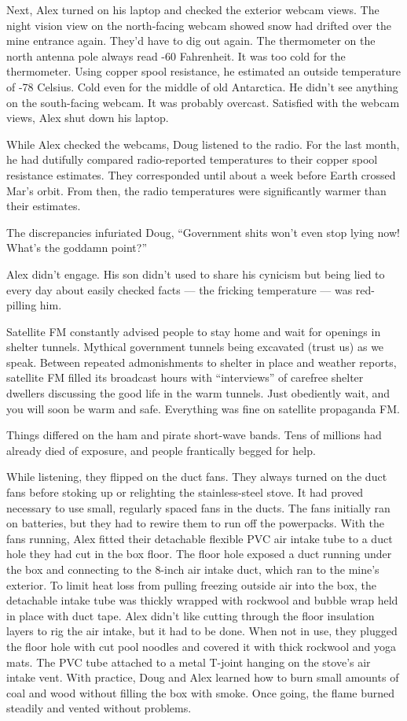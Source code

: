 Next, Alex turned on his laptop and checked the exterior webcam views.
The night vision view on the north-facing webcam showed snow had drifted
over the mine entrance again. They'd have to dig out again. The
thermometer on the north antenna pole always read -60 Fahrenheit. It was
too cold for the thermometer. Using copper spool resistance, he
estimated an outside temperature of -78 Celsius. Cold even for the
middle of old Antarctica. He didn't see anything on the south-facing
webcam. It was probably overcast. Satisfied with the webcam views, Alex
shut down his laptop.

While Alex checked the webcams, Doug listened to the radio. For the last
month, he had dutifully compared radio-reported temperatures to their
copper spool resistance estimates. They corresponded until about a week
before Earth crossed Mar's orbit. From then, the radio temperatures were
significantly warmer than their estimates.

The discrepancies infuriated Doug, ``Government shits won't even stop
lying now! What's the goddamn point?''

Alex didn't engage. His son didn't used to share his cynicism but being
lied to every day about easily checked facts --- the fricking
temperature --- was red-pilling him.

Satellite FM constantly advised people to stay home and wait for
openings in shelter tunnels. Mythical government tunnels being excavated
(trust us) as we speak. Between repeated admonishments to shelter in
place and weather reports, satellite FM filled its broadcast hours with
``interviews'' of carefree shelter dwellers discussing the good life in
the warm tunnels. Just obediently wait, and you will soon be warm and
safe. Everything was fine on satellite propaganda FM.

Things differed on the ham and pirate short-wave bands. Tens of millions
had already died of exposure, and people frantically begged for help.

While listening, they flipped on the duct fans. They always turned on
the duct fans before stoking up or relighting the stainless-steel stove.
It had proved necessary to use small, regularly spaced fans in the
ducts. The fans initially ran on batteries, but they had to rewire them
to run off the powerpacks. With the fans running, Alex fitted their
detachable flexible PVC air intake tube to a duct hole they had cut in
the box floor. The floor hole exposed a duct running under the box and
connecting to the 8-inch air intake duct, which ran to the mine's
exterior. To limit heat loss from pulling freezing outside air into the
box, the detachable intake tube was thickly wrapped with rockwool and
bubble wrap held in place with duct tape. Alex didn't like cutting
through the floor insulation layers to rig the air intake, but it had to
be done. When not in use, they plugged the floor hole with cut pool
noodles and covered it with thick rockwool and yoga mats. The PVC tube
attached to a metal T-joint hanging on the stove's air intake vent. With
practice, Doug and Alex learned how to burn small amounts of coal and
wood without filling the box with smoke. Once going, the flame burned
steadily and vented without problems.

